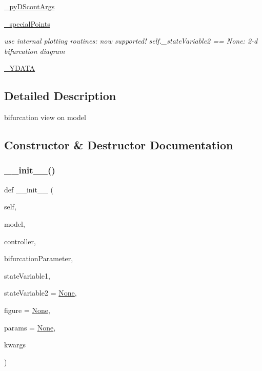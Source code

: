 \begin{DoxyCompactItemize}
\hyperlink{class_mu_mo_t_1_1_mu_mo_tbifurcation_view_aa56e2cffc879be68fdec55f29334415c}{\+\_\+py\+D\+Scont\+Args}
\item 
\hyperlink{class_mu_mo_t_1_1_mu_mo_tbifurcation_view_a0b40fc612e7c7203adf3274967cdd2ab}{\+\_\+special\+Points}
\begin{DoxyCompactList}\small\item\em use internal plotting routines\+: now supported! self.\+\_\+state\+Variable2 == None\+: 2-\/d bifurcation diagram \end{DoxyCompactList}\item 
\hyperlink{class_mu_mo_t_1_1_mu_mo_tbifurcation_view_a225ffda570ae3d9d5675af2fe28c1cbe}{\+\_\+\+Y\+D\+A\+TA}
\end{DoxyCompactItemize}


\subsection{Detailed Description}
bifurcation view on model 

\subsection{Constructor \& Destructor Documentation}
\mbox{\label{class_mu_mo_t_1_1_mu_mo_tbifurcation_view_ac1764fc6547304e629425a5329dc7083}} 
\subsubsection{\texorpdfstring{\+\_\+\+\_\+init\+\_\+\+\_\+()}{\_\_init\_\_()}}
{\footnotesize\ttfamily def \+\_\+\+\_\+init\+\_\+\+\_\+ (\begin{DoxyParamCaption}\item[{}]{self,  }\item[{}]{model,  }\item[{}]{controller,  }\item[{}]{bifurcation\+Parameter,  }\item[{}]{state\+Variable1,  }\item[{}]{state\+Variable2 = {\ttfamily \hyperlink{class_mu_mo_t_1_1_mu_mo_tbifurcation_view_ac7485dcc8d256a6f197ed7802687f252}{None}},  }\item[{}]{figure = {\ttfamily \hyperlink{class_mu_mo_t_1_1_mu_mo_tbifurcation_view_ac7485dcc8d256a6f197ed7802687f252}{None}},  }\item[{}]{params = {\ttfamily \hyperlink{class_mu_mo_t_1_1_mu_mo_tbifurcation_view_ac7485dcc8d256a6f197ed7802687f252}{None}},  }\item[{}]{kwargs }\end{DoxyParamCaption})}



